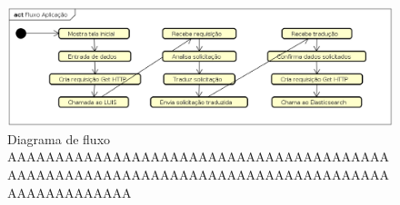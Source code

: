 \begin{figure}[!htb]
        \caption{\label{Fluxo aplicação}Diagrama de fluxo AAAAAAAAAAAAAAAAAAAAAAAAAAAAAAAAAAAAAAAAAAAAAAAAAAAAAAAAAAAAAAAAAAAAAAAAAAAAAAAAAAAAAAAAAAAAA}
        \begin{center}
                \includegraphics[width=\textwidth]{imagens/teste.eps}
        \end{center}
\end{figure}

